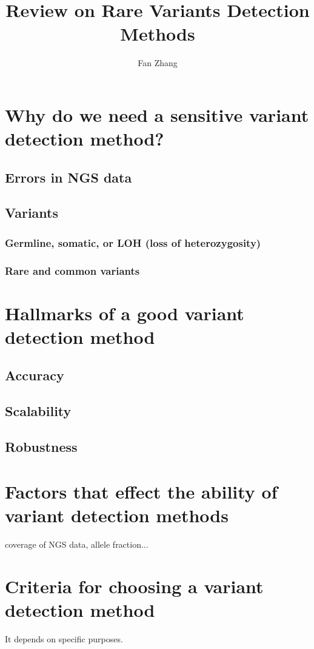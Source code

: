 \documentclass[11pt,reqno]{amsart}
\title[]{Review on Rare Variants Detection Methods}
\author{Fan Zhang}
\begin{document}
\maketitle

\section{Why do we need a sensitive variant detection method?}
\subsection{Errors in NGS data}
\subsection{Variants}
\subsubsection{Germline, somatic, or LOH (loss of heterozygosity)}
\subsubsection{Rare and common variants}

\section{Hallmarks of a good variant detection method}
\subsection{Accuracy}
\subsection{Scalability}
\subsection{Robustness}

\section{Factors that effect the ability of variant detection methods}
coverage of NGS data, allele fraction...

\section{Criteria for choosing a variant detection method}
It depends on specific purposes.
\end{document}
